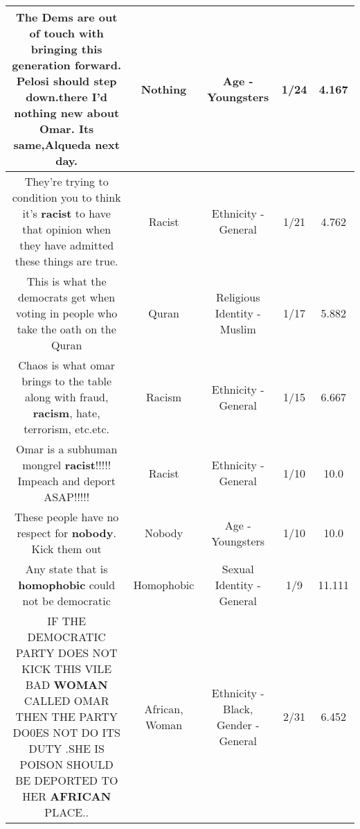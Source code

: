 \documentclass[11pt]{article}
\newlength\mylength
\begin{document}
\begin{center}
\begin{longtable}{|C{.65\mylength}|C{.30\mylength}|C{.12\mylength}|C{.12\mylength}|C{.12\mylength}|}
  \small The Dems are out of touch with bringing this generation forward. Pelosi should step down.there I'd \textbf{nothing} new about Omar. Its same,Alqueda next day.\normalsize   & Nothing & Age - Youngsters & 1/24 & 4.167 \\  \hline
  \small They're trying to condition you to think it's \textbf{racist} to have that opinion when they have admitted these things are true.\normalsize   & Racist & Ethnicity - General & 1/21 & 4.762 \\  \hline
  \small This is what the democrats get when voting in people who take the oath on the Quran\normalsize   & Quran & Religious Identity - Muslim & 1/17 & 5.882 \\  \hline
  \small Chaos is what omar brings to the table along with fraud, \textbf{racism}, hate, terrorism, etc.etc.\normalsize   & Racism & Ethnicity - General & 1/15 & 6.667 \\  \hline
  \small Omar is a subhuman mongrel \textbf{racist}!!!!! Impeach and deport ASAP!!!!!\normalsize   & Racist & Ethnicity - General & 1/10 & 10.0 \\  \hline
  \small These people have no respect for \textbf{nobody}.  Kick them out\normalsize   & Nobody & Age - Youngsters & 1/10 & 10.0 \\  \hline
  \small Any state that is \textbf{homophobic} could not be democratic\normalsize   & Homophobic & Sexual Identity - General & 1/9 & 11.111 \\  \hline
  \small IF THE DEMOCRATIC PARTY DOES NOT KICK THIS VILE BAD \textbf{WOMAN} CALLED OMAR THEN THE PARTY DO0ES NOT DO ITS DUTY .SHE IS POISON SHOULD BE DEPORTED TO HER \textbf{AFRICAN} PLACE..\normalsize   & African, Woman & Ethnicity - Black, Gender - General & 2/31 & 6.452 \\  \hline

\end{longtable}
\end{center}
\end{document}
